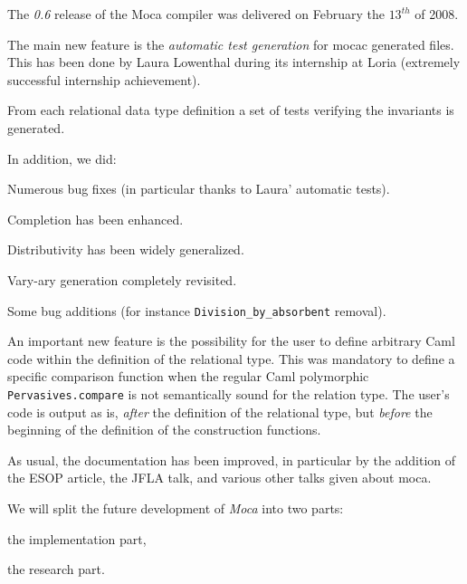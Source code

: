 

The {\em 0.6} release of the Moca compiler was delivered on February the
$13^{th}$ of 2008.

The main new feature is the {\em automatic test generation} for mocac
generated files. This has been done by Laura Lowenthal during its internship
at Loria (extremely successful internship achievement).

From each relational data type definition a set of tests verifying the
invariants is generated.


In addition, we did:

\begin{citemize}
  \item Numerous bug fixes (in particular thanks to Laura' automatic tests).
  \item Completion has been enhanced.
  \item Distributivity has been widely generalized.
  \item Vary-ary generation completely revisited.
  \item Some bug additions (for instance {\tt Division\_by\_absorbent} removal).
\end{citemize}



An important new feature is the possibility for the user to define
arbitrary Caml code within the definition of the relational type. This was
mandatory to define a specific comparison function when the regular Caml
polymorphic {\tt Pervasives.compare} is not semantically sound for the
relation type. The user's code is output as is, {\em after} the definition of the
relational type, but {\em before} the beginning of the definition of the
construction functions.

As usual, the documentation has been improved, in particular by the addition
of the ESOP article, the JFLA talk, and various other talks given about moca.



We will split the future development of {\em Moca} into two parts:

\begin{citemize}
  \item the implementation part,
  \item the research part.
\end{citemize}

